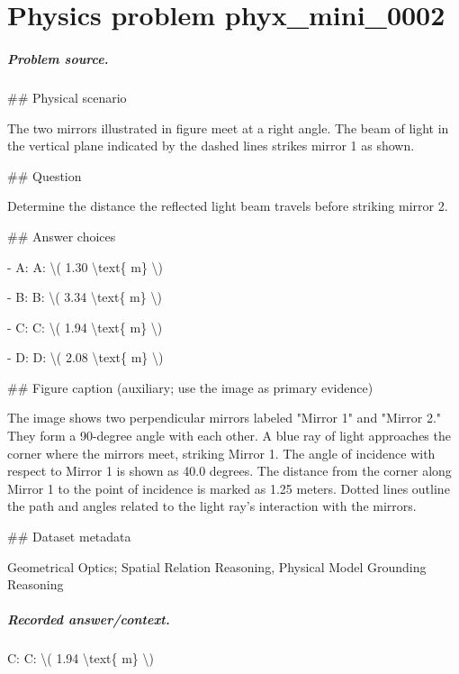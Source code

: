 
\chapter{Physics problem phyx\_mini\_0002}
\label{ch:PhyXMiniProblems_problem_phyx_mini_0002}

\paragraph{Problem source.}
\#\# Physical scenario

The two mirrors illustrated in figure meet at a right angle. The beam of light in the vertical plane indicated by the dashed lines strikes mirror 1 as shown.

\#\# Question

Determine the distance the reflected light beam travels before striking mirror 2.

\#\# Answer choices

- A: A: \textbackslash{}( 1.30 \textbackslash{}text\{ m\} \textbackslash{})

- B: B: \textbackslash{}( 3.34 \textbackslash{}text\{ m\} \textbackslash{})

- C: C: \textbackslash{}( 1.94 \textbackslash{}text\{ m\} \textbackslash{})

- D: D: \textbackslash{}( 2.08 \textbackslash{}text\{ m\} \textbackslash{})

\#\# Figure caption (auxiliary; use the image as primary evidence)

The image shows two perpendicular mirrors labeled "Mirror 1" and "Mirror 2." They form a 90-degree angle with each other. A blue ray of light approaches the corner where the mirrors meet, striking Mirror 1. The angle of incidence with respect to Mirror 1 is shown as 40.0 degrees. The distance from the corner along Mirror 1 to the point of incidence is marked as 1.25 meters. Dotted lines outline the path and angles related to the light ray’s interaction with the mirrors.

\#\# Dataset metadata

Geometrical Optics; Spatial Relation Reasoning, Physical Model Grounding Reasoning

\paragraph{Recorded answer/context.}
C: C: \textbackslash{}( 1.94 \textbackslash{}text\{ m\} \textbackslash{})

